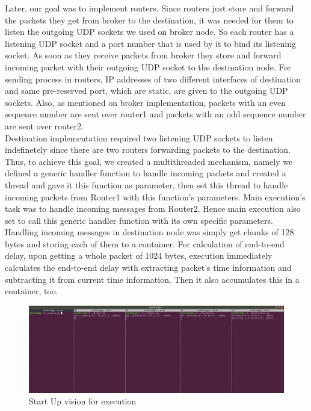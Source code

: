 \documentclass[conference]{IEEEtran}
\begin{document}
Later, our goal was to implement routers. Since routers just store and forward the packets they get from broker to the destination, it was needed for them to listen the outgoing UDP sockets we used on broker node. So each router has a listening UDP socket and a port number that is used by it to bind its listening socket. As soon as they receive packets from broker they store and forward incoming packet with their outgoing UDP socket to the destination node. For sending process in routers, IP addresses of two different interfaces of destination and same pre-reserved port, which are static, are given to the outgoing UDP sockets. Also, as mentioned on broker implementation, packets with an even sequence number are sent over router1 and packets with an odd sequence number are sent over router2. \\

Destination implementation required two listening UDP sockets to listen indefinetely since there are two routers forwarding packets to the destination. Thus, to achieve this goal, we created a multithreaded mechanism, namely we defined a generic handler function to handle incoming packets and created a thread and gave it this function as parameter, then set this thread to handle incoming packets from Router1 with this function's parameters. Main execution's task was to handle incoming messages from Router2. Hence main execution also set to call this generic handler function with its own specific parameters. Handling incoming messages in destination node was simply get chunks of 128 bytes and storing each of them to a container. For calculation of end-to-end delay, upon getting a whole packet of 1024 bytes, execution immediately calculates the end-to-end delay with extracting packet's time information and subtracting it from current time information. Then it also accumulates this in a container, too. \\

\begin{figure}
    \centering
    \includegraphics[scale=0.14]{start-up.png}
    \caption{Start Up vision for execution}
\end{figure}
\end{document}
